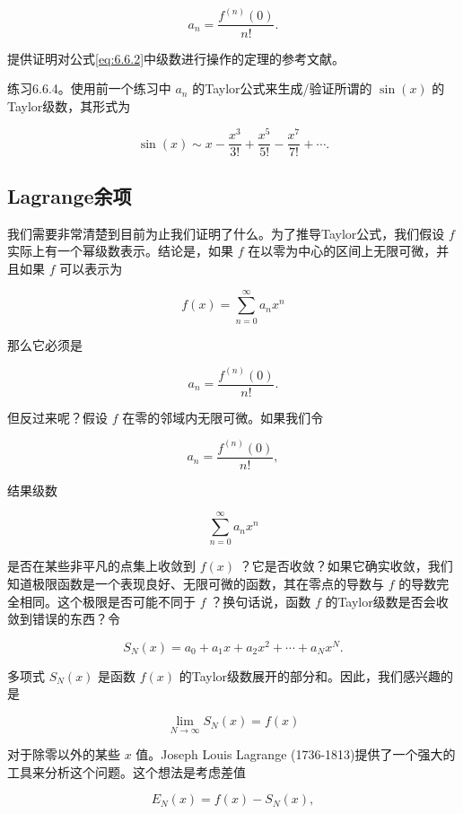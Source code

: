 \[
{a}_{n} = \frac{{f}^{\left( n\right) }\left( 0\right) }{n!}.
\]

提供证明对公式\eqref{eq:6.6.2}中级数进行操作的定理的参考文献。

练习6.6.4。使用前一个练习中 \({a}_{n}\) 的Taylor公式来生成/验证所谓的 \(\sin \left( x\right)\) 的Taylor级数，其形式为

\[
\sin \left( x\right)  \sim  x - \frac{{x}^{3}}{3!} + \frac{{x}^{5}}{5!} - \frac{{x}^{7}}{7!} + \cdots .
\]

\subsection{Lagrange余项}

我们需要非常清楚到目前为止我们证明了什么。为了推导Taylor公式，我们假设 \(f\) 实际上有一个幂级数表示。结论是，如果 \(f\) 在以零为中心的区间上无限可微，并且如果 \(f\) 可以表示为

\[
f\left( x\right)  = \mathop{\sum }\limits_{{n = 0}}^{\infty }{a}_{n}{x}^{n}
\]

那么它必须是

\[
{a}_{n} = \frac{{f}^{\left( n\right) }\left( 0\right) }{n!}.
\]

但反过来呢？假设 \(f\) 在零的邻域内无限可微。如果我们令

\[
{a}_{n} = \frac{{f}^{\left( n\right) }\left( 0\right) }{n!},
\]

结果级数

\[
\mathop{\sum }\limits_{{n = 0}}^{\infty }{a}_{n}{x}^{n}
\]

是否在某些非平凡的点集上收敛到 \(f\left( x\right)\) ？它是否收敛？如果它确实收敛，我们知道极限函数是一个表现良好、无限可微的函数，其在零点的导数与 \(f\) 的导数完全相同。这个极限是否可能不同于 \(f\) ？换句话说，函数 \(f\) 的Taylor级数是否会收敛到错误的东西？令

\[
{S}_{N}\left( x\right)  = {a}_{0} + {a}_{1}x + {a}_{2}{x}^{2} + \cdots  + {a}_{N}{x}^{N}.
\]

多项式 \({S}_{N}\left( x\right)\) 是函数 \(f\left( x\right)\) 的Taylor级数展开的部分和。因此，我们感兴趣的是

\[
\mathop{\lim }\limits_{{N \rightarrow  \infty }}{S}_{N}\left( x\right)  = f\left( x\right)
\]

对于除零以外的某些 \(x\) 值。Joseph Louis Lagrange (1736-1813)提供了一个强大的工具来分析这个问题。这个想法是考虑差值

\[
{E}_{N}\left( x\right)  = f\left( x\right)  - {S}_{N}\left( x\right) ,
\]

